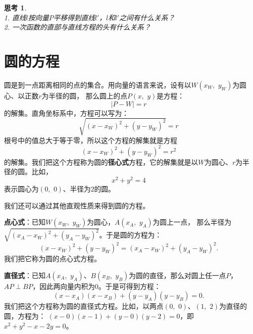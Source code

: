\documentclass[12pt,UTF8]{ctexbook}
\newtheorem{sk}{思考}[section]
\begin{document}
\begin{sk}
    \mbox{}\\
    1. 直线$l$按向量$P$平移得到直线$l'$，$l$和$l'$之间有什么关系？ \\
    2. 一次函数的直部与直线方程的头有什么关系？
\end{sk}

\section{圆的方程}

圆是到一点距离相同的点的集合。用向量的语言来说，设有以$W(x_W,\,\, y_W)$为圆心、以正数$r$为半径的圆，
那么圆上的点$P(x, \,\,y)$是方程：
$$|P - W| = r$$
的解集。直角坐标系中，方程可以写为：
$$\sqrt{(x - x_W)^2 + (y - y_W)^2} = r$$
根号中的值总大于等于零，所以这个方程的解集就是方程
$$(x - x_W)^2 + (y - y_W)^2 = r^2$$
的解集。我们把这个方程称为圆的\textbf{径心式}方程，它的解集就是以$W$为圆心、$r$为半径的圆。比如，
$$x^2 + y^2 = 4$$
表示圆心为$(0,\,\,0)$、半径为$2$的圆。

我们还可以通过其他直观性质来得到圆的方程。

\textbf{点心式}：已知$W(x_W,\,\, y_W)$为圆心，$A(x_A,\,\,y_A)$为圆上一点，
那么半径为$\sqrt{(x_A - x_W)^2 + (y_A - y_W)^2}$。于是圆的方程为：
$$ (x - x_W)^2 + (y - y_W)^2 = (x_A - x_W)^2 + (y_A - y_W)^2.$$
我们把它称为圆的点心式方程。

\textbf{直径式}：已知$A(x_A,\,\,y_A)$、$B(x_B,\,\,y_B)$为圆的直径，那么对圆上任一点$P$，$AP\perp BP$，因此两向量内积为$0$。于是可得到方程：
$$ (x - x_A)(x - x_B) + (y - y_A)(y - y_B) = 0.$$
我们把这个方程称为圆的直径式方程。比如，以两点$(0,\,\,0)$、$(1,\,\,2)$为直径的圆，方程为：
$ (x - 0)(x - 1) + (y - 0)(y - 2) = 0$，即$x^2 + y^2 - x - 2y = 0$。
\end{document}
